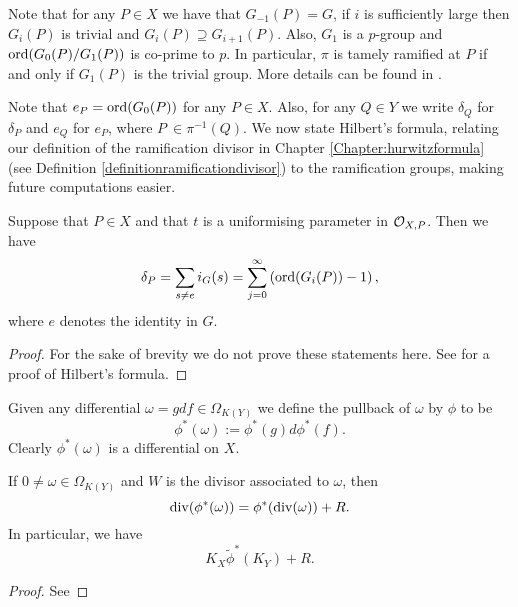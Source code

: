 Note that for any $P\in X$ we have that $G_{-1}(P)=G$, if $i$ is sufficiently large then $G_i(P)$ is trivial and $G_i(P)\supseteq G_{i+1}(P)$.
Also, $G_1$ is a $p$-group and $\operatorname{ord}(G_0(P)/G_1(P))$ is co-prime to $p$.
In particular, $\pi$ is tamely ramified at $P$ if and only if $G_1(P)$ is the trivial group.
More details can be found in \cite[Chap. IV, \S 1]{localfields}.%

Note that $e_P = \operatorname{ord} (G_0(P))$ for any $P \in X$.
Also, for any $Q \in Y$ we write $\delta_Q$ for $\delta_P$ and $e_Q$ for $e_P$, where $P\ \in \pi^{-1}(Q)$.
We now state Hilbert's formula, relating our definition of the ramification divisor in Chapter \ref{Chapter:hurwitzformula} (see Definition \ref{definitionramificationdivisor}) to the ramification groups, making future computations easier.


    \begin{thm}\label{hilbertsformula}
    Suppose that $P\in X$ and that $t$ is a uniformising parameter in ${\cal O}_{X,P}$.
    Then we have
        \begin{equation}
        \delta_P = \sum_{s\neq e}i_G(s)=\sum_{j=0}^{\infty}\left(\operatorname{ord}(G_i(P))-1\right),\label{ramdiv}
        \end{equation}
    where $e$ denotes the identity in $G$.
    \end{thm}
    \begin{proof}
    For the sake of brevity we do not prove these statements here. See \cite[Chap. IV, \S 1, Prop. 4]{localfields} for a proof of Hilbert's formula.
    \end{proof}

 
Given any differential $ \omega = gdf \in \Omega_{K(Y)}$ we define the pullback of $\omega$ by $\phi$ to be
    \[
    \phi^*(\omega) := \phi^*(g)d\phi^*(f).
    \]
Clearly $\phi^*(\omega)$ is a differential on $X$.

    \begin{thm}
    If $0 \neq \omega \in \Omega_{K(Y)}$ and $W$ is the divisor associated to $\omega$, then
        \begin{equation}\label{equationstronghurwitzformula}
        \operatorname{div}(\phi^*(\omega)) = \phi^*(\operatorname{div}(\omega)) + R.
        \end{equation}
    In particular, we have
        \[
        K_X \tilde \phi^*(K_Y) + R.
        \]
    \end{thm}
    \begin{proof}
    See 
    \end{proof}


